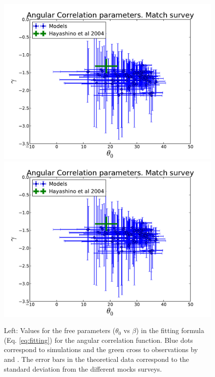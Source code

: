 \documentclass[usenatbib]{mn2e}
\begin{document}
\begin{figure}
\begin{center}
\includegraphics[width=0.46\linewidth,angle=0]{./plots/power_law_correlation.pdf} 
\hspace{5mm}  
\includegraphics[width=0.46\linewidth,angle=0]{./plots/power_law_correlation.pdf} 
\end{center}
\caption{Left: Values for the free parameters ($\theta_{0}$ vs $\beta$) 
in the fitting formula (Eq. \ref{eq:fitting}) for the angular
correlation function. Blue dots correspond to simulations and the
green cross to observations by \citet{Hayashino2004} and
\citet{Ouchi2010}. The error bars in the   theoretical data correspond
to the standard deviation from the different mocks surveys. 
\label{fig:correlation_parameters}}
\end{figure} 
\end{document}
